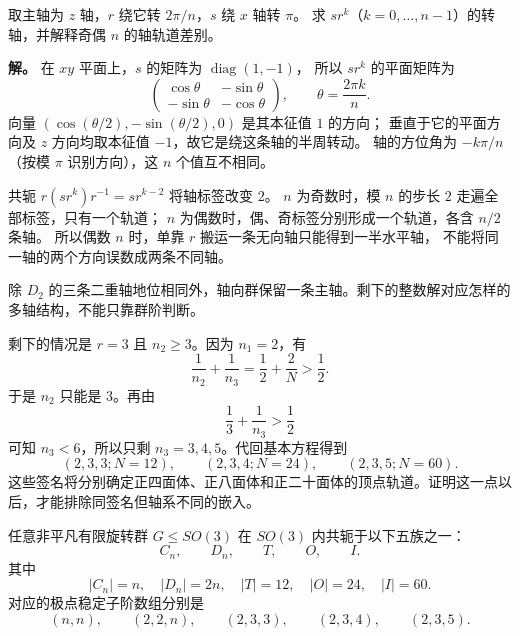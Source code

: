 \begin{example}
取主轴为 $z$ 轴，$r$ 绕它转 $2\pi/n$，$s$ 绕 $x$ 轴转 $\pi$。
求 $sr^k$（$k=0,\dots,n-1$）的转轴，并解释奇偶 $n$ 的轴轨道差别。

\textbf{解。} 在 $xy$ 平面上，$s$ 的矩阵为 $\operatorname{diag}(1,-1)$，
所以 $sr^k$ 的平面矩阵为
\[
\begin{pmatrix}\cos\theta&-\sin\theta\\-\sin\theta&-\cos\theta\end{pmatrix},
\qquad\theta=\frac{2\pi k}{n}.
\]
向量 $(\cos(\theta/2),-\sin(\theta/2),0)$ 是其本征值 $1$ 的方向；
垂直于它的平面方向及 $z$ 方向均取本征值 $-1$，故它是绕这条轴的半周转动。
轴的方位角为 $-k\pi/n$（按模 $\pi$ 识别方向），这 $n$ 个值互不相同。

共轭 $r(sr^k)r^{-1}=sr^{k-2}$ 将轴标签改变 $2$。
$n$ 为奇数时，模 $n$ 的步长 $2$ 走遍全部标签，只有一个轨道；
$n$ 为偶数时，偶、奇标签分别形成一个轨道，各含 $n/2$ 条轴。
所以偶数 $n$ 时，单靠 $r$ 搬运一条无向轴只能得到一半水平轴，
不能将同一轴的两个方向误数成两条不同轴。
\end{example}

除 $D_2$ 的三条二重轴地位相同外，轴向群保留一条主轴。剩下的整数解对应怎样的多轴结构，不能只靠群阶判断。

剩下的情况是 $r=3$ 且 $n_2\ge3$。因为 $n_1=2$，有
\[
\frac1{n_2}+\frac1{n_3}=\frac12+\frac2N>\frac12.
\]
于是 $n_2$ 只能是 $3$。再由
\[
\frac13+\frac1{n_3}>\frac12
\]
可知 $n_3<6$，所以只剩 $n_3=3,4,5$。代回基本方程得到
\[
(2,3,3;N=12),\qquad
(2,3,4;N=24),\qquad
(2,3,5;N=60).
\]
这些签名将分别确定正四面体、正八面体和正二十面体的顶点轨道。证明这一点以后，才能排除同签名但轴系不同的嵌入。

\begin{theorem}
任意非平凡有限旋转群 $G\leqslant SO(3)$ 在 $SO(3)$ 内共轭于以下五族之一：
\[
C_n,\qquad D_n,\qquad T,\qquad O,\qquad I.
\]
其中
\[
|C_n|=n,
\quad |D_n|=2n,
\quad |T|=12,
\quad |O|=24,
\quad |I|=60.
\]
对应的极点稳定子阶数组分别是
\[
(n,n),\qquad(2,2,n),\qquad(2,3,3),\qquad(2,3,4),\qquad(2,3,5).
\]
\label{thm:finite-so3-classification}

\end{theorem}

